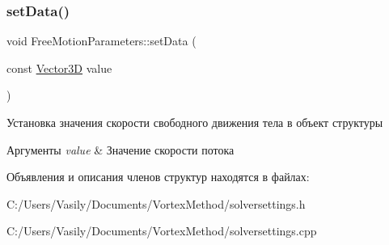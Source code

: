 \subsubsection{\texorpdfstring{set\+Data()}{setData()}}
{\footnotesize\ttfamily void Free\+Motion\+Parameters\+::set\+Data (\begin{DoxyParamCaption}\item[{const \mbox{\hyperlink{class_vector3_d}{Vector3D}}}]{value }\end{DoxyParamCaption})}

Установка значения скорости свободного движения тела в объект структуры 
\begin{DoxyParams}{Аргументы}
{\em value} & Значение скорости потока \\
\hline
\end{DoxyParams}


Объявления и описания членов структур находятся в файлах\+:\begin{DoxyCompactItemize}
\item 
C\+:/\+Users/\+Vasily/\+Documents/\+Vortex\+Method/solversettings.\+h\item 
C\+:/\+Users/\+Vasily/\+Documents/\+Vortex\+Method/solversettings.\+cpp\end{DoxyCompactItemize}
